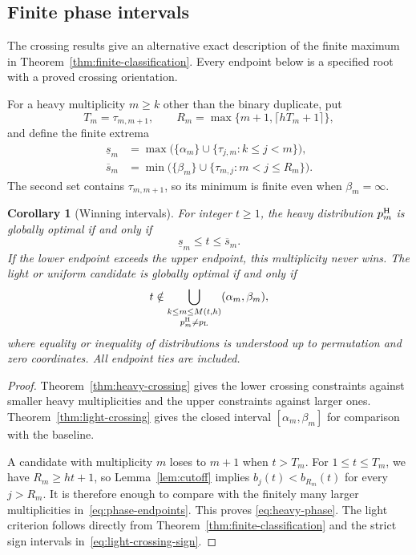 \documentclass[11pt]{article}
\numberwithin{equation}{section}
\newtheorem{corollary}[theorem]{Corollary}
\begin{document}
\subsection{Finite phase intervals}
The crossing results give an alternative exact description of the finite
maximum in Theorem~\ref{thm:finite-classification}. Every endpoint below
is a specified root with a proved crossing orientation.

For a heavy multiplicity $m\ge k$ other than the binary duplicate, put
\begin{equation}\label{eq:phase-cutoff}
 T_m=\tau_{m,m+1},\qquad
 R_m=\max\{m+1,\lceil hT_m+1\rceil\},
\end{equation}
and define the finite extrema
\begin{equation}\label{eq:phase-endpoints}
 \begin{aligned}
 \underline{s}_m
 &=\max\bigl(\{\alpha_m\}\cup
                \{\tau_{j,m}:k\le j<m\}\bigr),\\
 \overline{s}_m
 &=\min\bigl(\{\beta_m\}\cup
                \{\tau_{m,j}:m<j\le R_m\}\bigr).
 \end{aligned}
\end{equation}
The second set contains $\tau_{m,m+1}$, so its minimum is finite even
when $\beta_m=\infty$.

\begin{corollary}[Winning intervals]\label{cor:phase-intervals}
For integer $t\ge1$, the heavy distribution $p_m^{\rm H}$ is globally
optimal if and only if
\begin{equation}\label{eq:heavy-phase}
 \underline{s}_m\le t\le\overline{s}_m.
\end{equation}
If the lower endpoint exceeds the upper endpoint, this multiplicity never
wins. The light or uniform candidate is globally optimal if and only if
\begin{equation}\label{eq:light-phase}
 t\notin
 \bigcup_{\substack{k\le m\le M(t,h)\\p_m^{\rm H}\ne p_{\rm L}}}
       (\alpha_m,\beta_m),
\end{equation}
where equality or inequality of distributions is understood up to
permutation and zero coordinates. All endpoint ties are included.
\end{corollary}
\begin{proof}
Theorem~\ref{thm:heavy-crossing} gives the lower crossing constraints
against smaller heavy multiplicities and the upper constraints against
larger ones. Theorem~\ref{thm:light-crossing} gives the closed interval
$[\alpha_m,\beta_m]$ for comparison with the baseline.

A candidate with multiplicity $m$ loses to $m+1$ when $t>T_m$. For
$1\le t\le T_m$, we have $R_m\ge ht+1$, so
Lemma~\ref{lem:cutoff} implies $b_j(t)<b_{R_m}(t)$ for every $j>R_m$.
It is therefore enough to compare with the finitely many larger
multiplicities in~\eqref{eq:phase-endpoints}. This proves
\eqref{eq:heavy-phase}. The light criterion follows directly from
Theorem~\ref{thm:finite-classification} and the strict sign intervals
in~\eqref{eq:light-crossing-sign}.
\end{proof}
\end{document}
